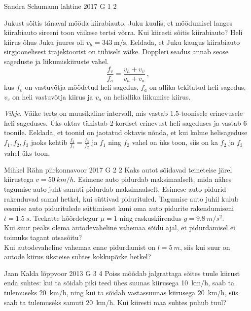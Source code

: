 \documentclass[11pt]{article}
\begin{document}
{%
{Sandra Schumann} %
{lahtine} %
{2017} %
{G 1} %
{2} %
{
\ifStatement
Jukust sõitis tänaval mööda kiirabiauto. Juku kuulis, et möödumisel langes kiirabiauto sireeni toon väikese tertsi võrra. Kui kiiresti sõitis kiirabiauto? Heli kiirus õhus Juku juures oli $v_h = \SI{343}{\meter\per\second}$. Eeldada, et Juku kaugus kiirabiauto sirgjoonelisest trajektoorist on tühiselt väike. Doppleri seadus annab seose sageduste ja liikumiskiiruste vahel.
\[ \frac{f_v}{f_a} = \frac{v_h + v_v}{v_h + v_a} \ , \]
kus \(f_v\) on vastuvõtja mõõdetud heli sagedus, \(f_a\) on allika tekitatud heli sagedus, \(v_v\) on heli vastuvõtja kiirus ja \(v_a\) on heliallika liikumise kiirus.

\emph{Vihje}. Väike terts on muusikaline intervall, mis vastab \num{1.5}-toonisele erinevusele heli sageduses. Üks oktav tähistab 2-kordset erinevust heli sageduses ja vastab 6 toonile. Eeldada, et toonid on jaotatud oktavis nõnda, et kui kolme helisageduse $f_1, f_2, f_3$ jaoks kehtib $\frac{f_2}{f_1} = \frac{f_3}{f_2}$ ja $f_1$ ning $f_2$ vahel on üks toon, siis on ka $f_2$ ja $f_3$ vahel üks toon.
\fi
}

{Mihkel Rähn} %
{piirkonnavoor} %
{2017} %
{G 2} %
{2} %
{
\ifStatement
Kaks autot sõidavad teineteise järel kiirustega $v=\SI{50}{km/h}$. Esimene auto pidurdab maksimaalselt, mida nähes tagumise auto juht samuti pidurdab maksimaalselt. Esimese auto pidurid rakenduvad samal hetkel, kui süttivad pidurituled. Tagumise auto juhil kulub eesmise auto piduritulede süttimisest kuni oma auto pidurite rakendumiseni $t=\SI{1,5}{s}$. Teekatte hõõrdetegur $\mu=1$ ning raskuskiirendus $g=\SI{9,8}{m/s^2}$.\\
\osa Kui suur peaks olema autodevaheline vahemaa sõidu ajal, et pidurdamisel ei toimuks tagant otsasõitu?\\
\osa Kui autodevaheline vahemaa enne pidurdamist on $l=\SI{5}{m}$, siis kui suur on autode kiirus üksteise suhtes kokkupõrke hetkel?
\fi
}

{Jaan Kalda} %
{lõppvoor} %
{2013} %
{G 3} %
{4} %
{
\ifStatement
Poiss mõõdab jalgrattaga sõites tuule kiirust enda suhtes: kui ta sõidab piki teed ühes
suunas kiirusega \SI{10}{km/h}, saab ta tulemuseks \SI{20}{km/h}, ning kui ta sõidab
vastassuunas kiirusega \SI{20}{km/h}, siis saab ta tulemuseks samuti
\SI{20}{km/h}. Kui kiiresti maa suhtes puhub tuul?
\fi
}

}
\end{document}
